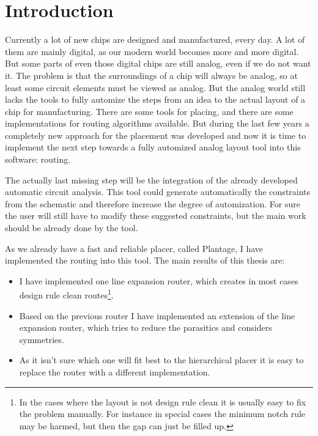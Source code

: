 \chapter{Introduction}

Currently a lot of new chips are designed and manufactured, every day. A lot of them are mainly digital, as our modern world becomes more and more digital. But some parts of even those digital chips are still analog, even if we do not want it. The problem is that the surroundings of a chip will always be analog, so at least some circuit elements must be viewed as analog. But the analog world still lacks the tools to fully automize the steps from an idea to the actual layout of a chip for manufacturing. There are some tools for placing, and there are some implementations for routing algorithms available. But during the last few years a completely new approach for the placement was developed and now it is time to implement the next step towards a fully automized analog layout tool into this software: routing.

The actually last missing step will be the integration of the already developed automatic circuit analysis. This tool could generate automatically the constraints from the schematic and therefore increase the degree of automization. For sure the user will still have to modify these suggested constraints, but the main work should be already done by the tool.

As we already have a fast and reliable placer, called Plantage, I have implemented the routing into this tool. The main results of this thesis are:
\begin{itemize}
\item I have implemented one line expansion router, which creates in most cases design rule clean routes\footnote{\label{foot:1}In the cases where the layout is not design rule clean it is usually easy to fix the problem manually. For instance in special cases the minimum notch rule may be harmed, but then the gap can just be filled up.}.
\item Based on the previous router I have implemented an extension of the line expansion router, which tries to reduce the parasitics and considers symmetries.
\item As it isn't sure which one will fit best to the hierarchical placer it is easy to replace the router with a different implementation.
\end{itemize}